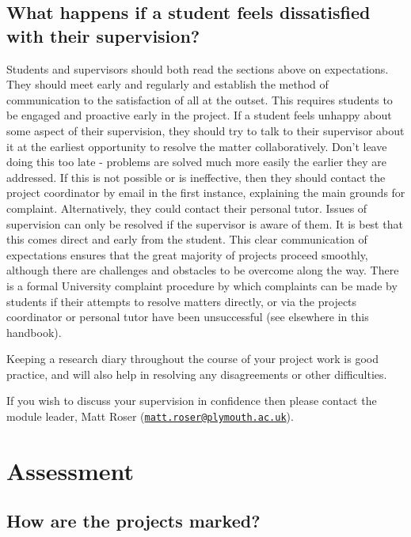 \documentclass[
]{book}
\begin{document}
\section{What happens if a student feels dissatisfied with their supervision?}\label{what-happens-if-a-student-feels-dissatisfied-with-their-supervision}

Students and supervisors should both read the sections above on expectations. They should meet early and regularly and establish the method of communication to the satisfaction of all at the outset. This requires students to be engaged and proactive early in the project. If a student feels unhappy about some aspect of their supervision, they should try to talk to their supervisor about it at the earliest opportunity to resolve the matter collaboratively. Don't leave doing this too late - problems are solved much more easily the earlier they are addressed. If this is not possible or is ineffective, then they should contact the project coordinator by email in the first instance, explaining the main grounds for complaint. Alternatively, they could contact their personal tutor. Issues of supervision can only be resolved if the supervisor is aware of them. It is best that this comes direct and early from the student. This clear communication of expectations ensures that the great majority of projects proceed smoothly, although there are challenges and obstacles to be overcome along the way. There is a formal University complaint procedure by which complaints can be made by students if their attempts to resolve matters directly, or via the projects coordinator or personal tutor have been unsuccessful (see elsewhere in this handbook).

Keeping a research diary throughout the course of your project work is good practice, and will also help in resolving any disagreements or other difficulties.

If you wish to discuss your supervision in confidence then please contact the module leader, Matt Roser (\href{mailto:matt.roser@plymouth.ac.uk}{\nolinkurl{matt.roser@plymouth.ac.uk}}).

\chapter{Assessment}\label{assessment}

\section{How are the projects marked?}\label{how-are-the-projects-marked}
\end{document}
